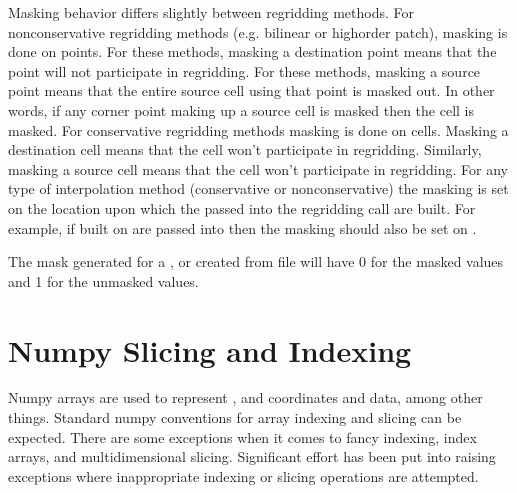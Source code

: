 \documentclass[letterpaper,10pt,english]{sphinxmanual}
\begin{document}
Masking behavior differs slightly between regridding methods. For non\sphinxhyphen{}conservative regridding methods
(e.g. bilinear or high\sphinxhyphen{}order patch), masking is done on points. For these methods, masking a destination
point means that the point will not participate in regridding. For these
methods, masking a source point means that the entire source cell using that point is masked out.
In other words, if any corner point making up a source cell is masked then the cell is masked.
For conservative regridding methods masking is done on cells.
Masking a destination cell means that the cell won’t participate in regridding.
Similarly, masking a source cell means that the cell won’t participate in regridding.
For any type of interpolation method (conservative or non\sphinxhyphen{}conservative)
the masking is set on the location upon which the
{\hyperref[\detokenize{field:ESMF.api.field.Field}]{}} passed into the regridding call are built.
For example, if {\hyperref[\detokenize{field:ESMF.api.field.Field}]{}} built on
{\hyperref[\detokenize{StaggerLoc:ESMF.api.constants.StaggerLoc.CENTER}]{}} are passed into
{\hyperref[\detokenize{regrid:ESMF.api.regrid.Regrid}]{}}
then the masking should also be set on {\hyperref[\detokenize{StaggerLoc:ESMF.api.constants.StaggerLoc.CENTER}]{}}.

The mask generated for a {\hyperref[\detokenize{grid:ESMF.api.grid.Grid}]{}},
{\hyperref[\detokenize{mesh:ESMF.api.mesh.Mesh}]{}} or {\hyperref[\detokenize{locstream:ESMF.api.locstream.LocStream}]{}} created
from file will have 0 for the masked values and 1 for the unmasked values.


\section{Numpy Slicing and Indexing}
\label{\detokenize{api:numpy-slicing-and-indexing}}
Numpy arrays are used to represent {\hyperref[\detokenize{grid:ESMF.api.grid.Grid}]{}}, {\hyperref[\detokenize{mesh:ESMF.api.mesh.Mesh}]{}} and {\hyperref[\detokenize{locstream:ESMF.api.locstream.LocStream}]{}} coordinates and {\hyperref[\detokenize{field:ESMF.api.field.Field}]{}} data,
among other things.  Standard numpy conventions for array indexing
and slicing can be expected.  There are some exceptions when it comes to fancy
indexing, index arrays, and multi\sphinxhyphen{}dimensional slicing.  Significant effort has
been put into raising exceptions where inappropriate indexing or slicing
operations are attempted.
\end{document}
